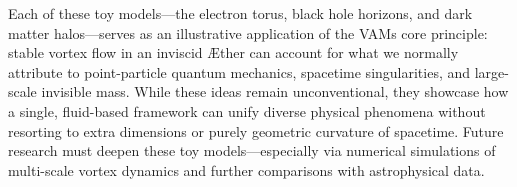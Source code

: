 Each of these toy models—the electron torus, black hole horizons, and dark matter halos—serves as an illustrative application of the VAM\rqs s core principle: stable vortex flow in an inviscid Æther can account for what we normally attribute to point-particle quantum mechanics, spacetime singularities, and large-scale invisible mass. While these ideas remain unconventional, they showcase how a single, fluid-based framework can unify diverse physical phenomena without resorting to extra dimensions or purely geometric curvature of spacetime. Future research must deepen these toy models—especially via numerical simulations of multi-scale vortex dynamics and further comparisons with astrophysical data.